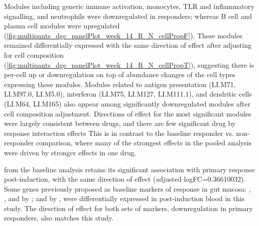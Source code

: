 Modules including generic immune activation, monocytes, TLR and inflammatory signalling, and neutrophils were downregulated in responders; 
whereas B cell and plasma cell modules were upregulated (\cref{fig:multipants_dge_panelPlot_week_14_R_N_cellPropF}).
These modules remained differentially expressed with the same direction of effect after adjusting for cell composition (\cref{fig:multipants_dge_panelPlot_week_14_R_N_cellPropT}), 
suggesting there is per-cell up or downregulation on top of abundance changes of the cell types expressing these modules.
Modules related to antigen presentation (LI.M71, LI.M97.0, LI.M5.0),
interferon (LI.M75, LI.M127, LI.M111.1),
and dendritic cells (LI.M64, LI.M165)
also appear among significantly downregulated modules after cell composition adjustment.
Directions of effect for the most significant modules were largely consistent between drugs, 
and there are few significant drug by response interaction effects
This is in contrast to the baseline responder vs. non-responder comparison,
where many of the strongest effects in the pooled analysis were driven by stronger effects in one drug.

 from the baseline analysis retains its significant association with primary response post-induction, 
with the same direction of effect (adjusted logFC=\num{0.36610032}).
Some genes previously proposed as baseline markers of response in gut mucosa: , ,  and  by \textcite{arijs2010PredictiveValueEpithelial}; and  by \textcite{west2017OncostatinDrivesIntestinal},
were differentially expressed in post-induction blood in this study.
The direction of effect for both sets of markers, downregulation in primary responders, also matches this study.

